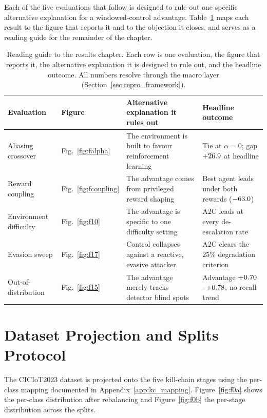 Each of the five evaluations that follow is designed to rule out one specific alternative explanation for a windowed-control advantage. Table~\ref{tab:results_guide} maps each result to the figure that reports it and to the objection it closes, and serves as a reading guide for the remainder of the chapter.

\begin{table}[!htbp]
\centering
\caption[Reading guide to the results chapter.]{Reading guide to the results chapter. Each row is one evaluation, the figure that reports it, the alternative explanation it is designed to rule out, and the headline outcome. All numbers resolve through the macro layer (Section~\ref{sec:repro_framework}).}
\label{tab:results_guide}
\small
\setlength{\tabcolsep}{5pt}
\begin{tabularx}{\textwidth}{@{}l l >{\raggedright\arraybackslash}X >{\raggedright\arraybackslash}X@{}}
\toprule
Evaluation & Figure & Alternative explanation it rules out & Headline outcome \\
\midrule
Aliasing crossover & Fig.~\ref{fig:falpha} & The environment is built to favour reinforcement learning & Tie at $\alpha=0$; gap $+26.9$ at headline \\
\addlinespace
Reward coupling & Fig.~\ref{fig:fcoupling} & The advantage comes from privileged reward shaping & Best agent leads under both rewards ($-63.0$) \\
\addlinespace
Environment difficulty & Fig.~\ref{fig:f10} & The advantage is specific to one difficulty setting & A2C leads at every de-escalation rate \\
\addlinespace
Evasion sweep & Fig.~\ref{fig:f17} & Control collapses against a reactive, evasive attacker & A2C clears the $25\%$ degradation criterion \\
\addlinespace
Out-of-distribution & Fig.~\ref{fig:f15} & The advantage merely tracks detector blind spots & Advantage $+0.70$--$+0.78$, no recall trend \\
\bottomrule
\end{tabularx}
\end{table}

\section{Dataset Projection and Splits Protocol}\label{sec:dataset_results}
The CICIoT2023 dataset is projected onto the five kill-chain stages using the per-class mapping documented in Appendix~\ref{app:kc_mapping}. Figure~\ref{fig:f0a} shows the per-class distribution after rebalancing and Figure~\ref{fig:f0b} the per-stage distribution across the splits.

